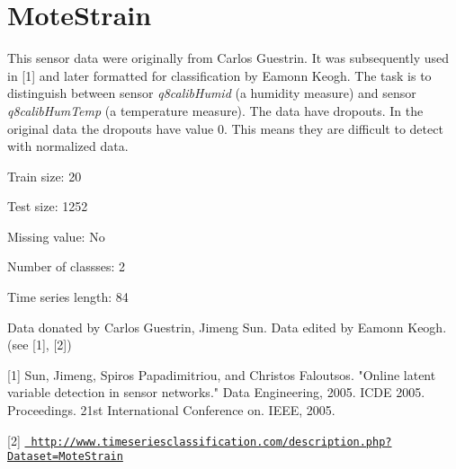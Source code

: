 \chapter{Mote\+Strain}
\hypertarget{md_external_2data_2UCRArchive__2018_2MoteStrain_2README}{}\label{md_external_2data_2UCRArchive__2018_2MoteStrain_2README}
\label{md_external_2data_2UCRArchive__2018_2MoteStrain_2README_autotoc_md155}%
%
 This sensor data were originally from Carlos Guestrin. It was subsequently used in \mbox{[}1\mbox{]} and later formatted for classification by Eamonn Keogh. The task is to distinguish between sensor {\itshape q8calib\+Humid} (a humidity measure) and sensor {\itshape q8calib\+Hum\+Temp} (a temperature measure). The data have dropouts. In the original data the dropouts have value 0. This means they are difficult to detect with normalized data.

Train size\+: 20

Test size\+: 1252

Missing value\+: No

Number of classses\+: 2

Time series length\+: 84

Data donated by Carlos Guestrin, Jimeng Sun. Data edited by Eamonn Keogh. (see \mbox{[}1\mbox{]}, \mbox{[}2\mbox{]})

\mbox{[}1\mbox{]} Sun, Jimeng, Spiros Papadimitriou, and Christos Faloutsos. "{}\+Online latent variable detection in sensor networks."{} Data Engineering, 2005. ICDE 2005. Proceedings. 21st International Conference on. IEEE, 2005.

\mbox{[}2\mbox{]} \href{http://www.timeseriesclassification.com/description.php?Dataset=MoteStrain}{\texttt{ http\+://www.\+timeseriesclassification.\+com/description.\+php?\+Dataset=\+Mote\+Strain}} 